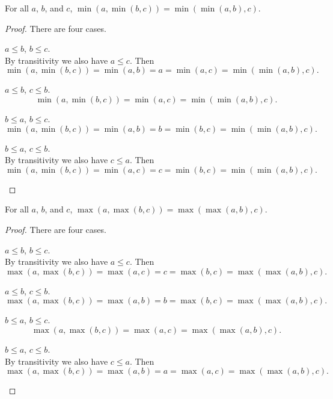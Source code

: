 \documentclass[../math.tex]{subfiles}
\begin{document}
\begin{theorem}
    For all $a$, $b$, and $c$, $\min(a, \min(b, c)) = \min(\min(a, b), c)$.
\end{theorem}
\begin{proof}
    There are four cases.
    \begin{case} $a \leq b$, $b \leq c$. \\
        By transitivity we also have $a \leq c$.  Then
        \[
            \min(a, \min(b, c)) = \min(a, b) =
            a
            = \min(a, c) = \min(\min(a, b), c).
        \]
    \end{case}
    \begin{case} $a \leq b$, $c \leq b$.
        \[
            \min(a, \min(b, c)) =
            \min(a, c)
            = \min(\min(a, b), c).
        \]
    \end{case}
    \begin{case} $b \leq a$, $b \leq c$.
        \[
            \min(a, \min(b, c)) = \min(a, b) =
            b
            = \min(b, c) = \min(\min(a, b), c).
        \]
    \end{case}
    \begin{case} $b \leq a$, $c \leq b$. \\
        By transitivity we also have $c \leq a$.  Then
        \[
            \min(a, \min(b, c)) = \min(a, c) =
            c
            = \min(b, c) = \min(\min(a, b), c).
        \]
    \end{case}
\end{proof}

\begin{theorem}
    For all $a$, $b$, and $c$, $\max(a, \max(b, c)) = \max(\max(a, b), c)$.
\end{theorem}
\begin{proof}
    There are four cases.
    \begin{case} $a \leq b$, $b \leq c$. \\
        By transitivity we also have $a \leq c$.  Then
        \[
            \max(a, \max(b, c)) = \max(a, c) =
            c
            = \max(b, c) = \max(\max(a, b), c).
        \]
    \end{case}
    \begin{case} $a \leq b$, $c \leq b$.
        \[
            \max(a, \max(b, c)) = \max(a, b) =
            b
            = \max(b, c) = \max(\max(a, b), c).
        \]
    \end{case}
    \begin{case} $b \leq a$, $b \leq c$.
        \[
            \max(a, \max(b, c)) =
            \max(a, c)
            = \max(\max(a, b), c).
        \]
    \end{case}
    \begin{case} $b \leq a$, $c \leq b$. \\
        By transitivity we also have $c \leq a$.  Then
        \[
            \max(a, \max(b, c)) = \max(a, b) =
            a
            = \max(a, c) = \max(\max(a, b), c).
        \]
    \end{case}
\end{proof}
\end{document}
